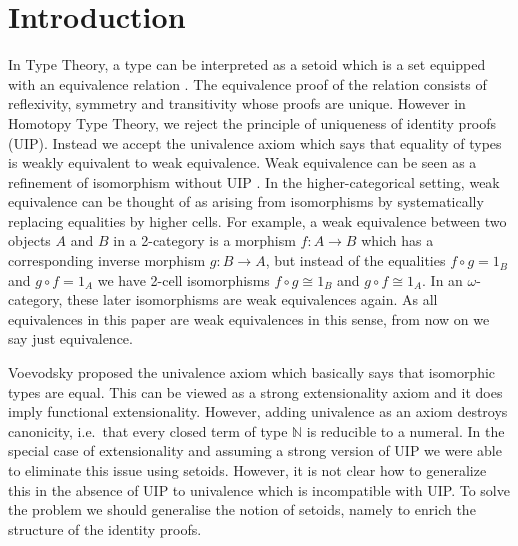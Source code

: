 \documentclass{sig-alternate}
\newcommand{\hott}{Homotopy Type Theory}
\begin{document}





\section{Introduction}



In Type Theory, a type can be interpreted as a setoid which is a set equipped with an equivalence relation \cite{alti:lics99}.
The equivalence proof of the relation consists of reflexivity, symmetry and transitivity whose proofs are unique. 
However in \hott{}, we reject the principle of uniqueness of identity proofs (UIP). 
Instead we accept the univalence axiom which says that equality of types is weakly equivalent to weak equivalence. 
Weak equivalence can be seen as a refinement of isomorphism without UIP \cite{txa:csl}. 
In the higher-categorical setting, weak equivalence can be thought of as arising from isomorphisms by systematically replacing equalities by higher cells.  
For example, a weak equivalence 
between two objects $A$ and $B$ in a 2-category is a morphism $f : A \rightarrow B$ which has a
corresponding inverse morphism $ g : B \rightarrow A$, but instead of the
equalities $f ∘ g = 1_B$ and $g ∘ f = 1_A$ we have 2-cell isomorphisms $f ∘ g ≅ 1_B$ and $g ∘ f ≅ 1_A$. In an $\omega$-category, these later isomorphisms are weak equivalences again. As all equivalences in this paper are weak equivalences in this sense, from now on we say just equivalence.


Voevodsky proposed the univalence axiom which basically says that
isomorphic types are equal. This can be viewed as a strong
extensionality axiom and it does imply functional extensionality.
However, adding
univalence as an axiom destroys canonicity, i.e.\ that every closed
term of type $\mathbb{N}$ is reducible to a numeral. In the special case of
extensionality and assuming a strong version of UIP we were able to
eliminate this issue \cite{alti:lics99,alti:ott-conf} using
setoids. However, it is not clear how to generalize this in the
absence of UIP to
univalence which is incompatible with UIP. To solve the problem we
should generalise the notion of setoids, namely to enrich the
structure of the identity proofs.
\end{document}
